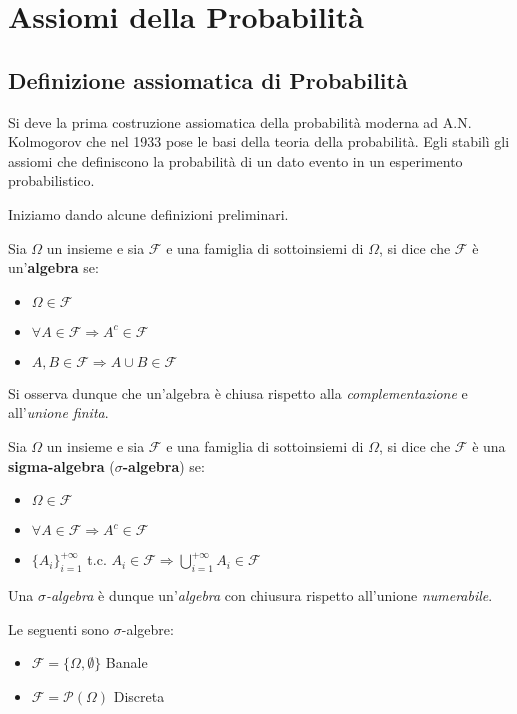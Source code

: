 \section{Assiomi della Probabilità}
\subsection{Definizione assiomatica di Probabilità}
Si deve la prima costruzione assiomatica della probabilità moderna ad A.N. Kolmogorov che nel 1933 pose le basi della teoria della probabilità. Egli stabilì gli assiomi che definiscono la probabilità di un dato evento in un esperimento probabilistico.

Iniziamo dando alcune definizioni preliminari.
\begin{definition}
Sia \(\Omega\) un insieme e sia $\mathscr{F}$ e una famiglia di sottoinsiemi di \(\Omega\), si dice che $\mathscr{F}$ è un'\textbf{algebra} se:
\begin{itemize}
    \item $\Omega\in\mathscr{F}$
    \item $\forall A \in \mathscr{F} \Rightarrow A^c \in \mathscr{F}$
    \item $A,B \in \mathscr{F} \Rightarrow A \cup B \in \mathscr{F}$          
\end{itemize}
\end{definition}
\noindent
Si osserva dunque che un'algebra è chiusa rispetto alla \textit{complementazione} e all'\textit{unione finita}.
\begin{definition}
Sia \(\Omega\) un insieme e sia $\mathscr{F}$ e una famiglia di sottoinsiemi di \(\Omega\), si dice che $\mathscr{F}$ è una \textbf{sigma-algebra} (\textbf{$\sigma$-algebra}) se:
\begin{itemize}
    \item $\Omega\in\mathscr{F}$
    \item $\forall A \in \mathscr{F} \Rightarrow A^c \in \mathscr{F}$
    \item $\{A_i\}_{i=1}^{+\infty}$ t.c. $A_i \in \mathscr{F} \Rightarrow \bigcup\limits_{i=1}^{+\infty} A_i \in \mathscr{F}$ 
\end{itemize}
\end{definition}
\noindent
Una \textit{$\sigma$-algebra} è dunque un'\textit{algebra} con chiusura rispetto all'unione \textit{numerabile}.

\begin{example}
Le seguenti sono $\sigma$-algebre:
\begin{itemize}
    \item $\mathscr{F} = \{\Omega , \emptyset\}$ Banale
    \item $\mathscr{F} = \mathscr{P}(\Omega)$ Discreta
\end{itemize}
\end{example}


